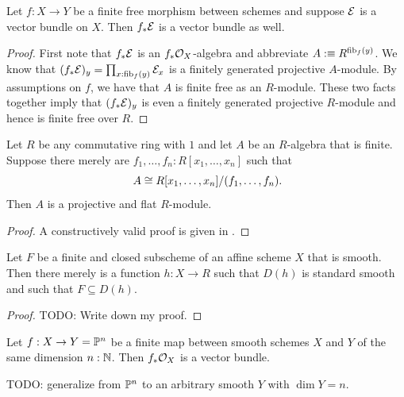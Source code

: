 \begin{lemma}
  \label{finite-free-morphisms-preserve-vector-bundles}
  Let $f : X \to Y$ be a finite free morphism between schemes and suppose $\mathcal{E}$ is a vector bundle on $X$.
  Then $f_\ast \mathcal{E}$ is a vector bundle as well.
\end{lemma}

\begin{proof}
  First note that $f_\ast\mathcal{E}$ is an $f_\ast\mathcal{O}_X$-algebra and abbreviate $A :\equiv R^{\mathrm{fib}_f(y)}$.
  We know that $(f_\ast\mathcal{E})_y = \prod_{x:\mathrm{fib}_f(y)}\mathcal{E}_x$ is a finitely generated projective $A$-module.
  By assumptions on $f$, we have that $A$ is finite free as an $R$-module.
  These two facts together imply that $(f_\ast \mathcal{E})_y$ is even a finitely generated projective $R$-module and hence is finite free over $R$.
\end{proof}

\begin{theorem}
  \label{miracle-flatness}
  Let $R$ be any commutative ring with $1$ and let $A$ be an $R$-algebra that is finite.
  Suppose there merely are $f_1,\dots,f_n:R[x_1,\dots,x_n]$ such that
  \[
    A \cong R[x_1,\dots,x_n]/(f_1,\dots,f_n) \rlap{.}
  \]
  Then $A$ is a projective and flat $R$-module.
\end{theorem}

\begin{proof}
  A constructively valid proof is given in \cite[Théorème 12]{lombardi2025theoremesmitetlenstra}.
\end{proof}


\begin{lemma}
  \label{fin-subscheme-contained-in-std-smooth}
  Let $F$ be a finite and closed subscheme of an affine scheme $X$ that is smooth.
  Then there merely is a function $h : X \to R$ such that $D(h)$ is standard smooth and such that $F \subseteq D(h)$.
\end{lemma}

\begin{proof}
  {\color{red}TODO: Write down my proof.}
\end{proof}

\begin{lemma}
  \label{finite-map-of-equidimensional-smooth-schemes-is-finite-free}
  Let $f : X \to Y = \mathbb{P}^n$ be a finite map between smooth schemes $X$ and $Y$ of the same dimension $n:\mathbb N$.
  Then $f_\ast\mathcal{O}_X$ is a vector bundle.
\end{lemma}

{\color{red}TODO: generalize from $\mathbb{P}^n$ to an arbitrary smooth $Y$ with $\dim Y = n$.}

